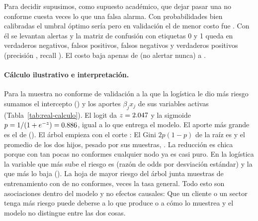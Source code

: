 Para decidir supusimos, como supuesto académico, que dejar pasar una no
conforme cuesta \RealCostoFN{} veces lo que una falsa alarma. Con
probabilidades bien calibradas el umbral óptimo sería
\RealUmbralTeorico{} pero en validación el de menor costo fue
\RealUmbral{}. Con él se levantan \RealUmbralAlertas{} alertas y la matriz
de confusión con etiquetas 0 y 1 queda en \RealUmbralTN{} verdaderos
negativos, \RealUmbralFP{} falsos positivos, \RealUmbralFN{} falsos
negativos y \RealUmbralTP{} verdaderos positivos (precisión
\RealUmbralPrecision{}, recall \RealUmbralRecall{}). El costo baja apenas de
\RealUmbralCostoNada{} (no alertar nunca) a \RealUmbralCosto{}.

\paragraph{Cálculo ilustrativo e interpretación.} Para la muestra no
conforme de validación a la que la logística le dio más riesgo sumamos el
intercepto (\RealCalcIntercepto{}) y los \RealCalcTerminos{} aportes
$\beta_j x_j$ de sus variables activas (Tabla~\ref{tab:real-calculo}). El
logit da $z = 2.047$ y la sigmoide $p = 1/(1 + e^{-z}) =
0.886$, igual a lo que entrega el modelo. El aporte más grande es el
de \RealCalcMayor{} (\RealCalcMayorAporte{}). El árbol empieza con el corte
\RealArbolPrimerCorte{}: El Gini $2p(1-p)$ de la raíz es
\RealArbolGiniAntes{} y el promedio de los dos hijos, pesado por sus
muestras, \RealArbolGiniDespues{}. La reducción es chica porque con tan
pocas no conformes cualquier nodo ya es casi puro. En la logística la
variable que más sube el riesgo es \RealOddsSube{} (razón de odds
\RealOddsSubeValor{} por desviación estándar) y la que más lo baja
\RealOddsBaja{} (\RealOddsBajaValor{}). La hoja de mayor riesgo del árbol
junta \RealHojaFilas{} muestras de entrenamiento con \RealHojaFraccion{} de
no conformes, \RealHojaVeces{} veces la tasa general. Todo esto son
asociaciones dentro del modelo y no efectos causales: Que un cliente o un
sector tenga más riesgo puede deberse a lo que produce o a cómo lo muestrea
y el modelo no distingue entre las dos cosas.

\begin{table}[!htbp]
\centering
{}
\caption{Cálculo ilustrativo de la regresión logística para una muestra de
validación: Cada aporte es el coeficiente por el valor estandarizado o la
indicadora.}
\label{tab:real-calculo}
\end{table}

